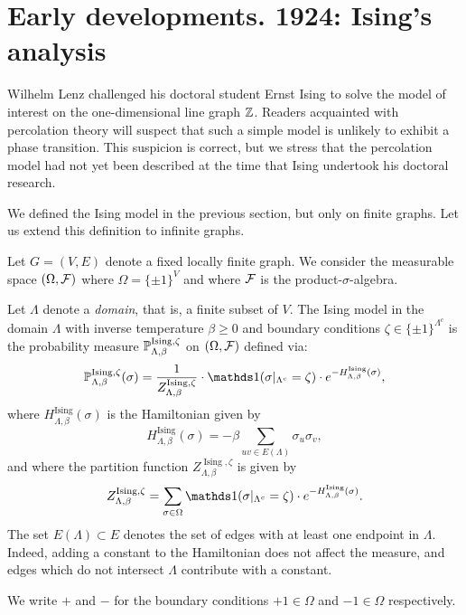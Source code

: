 \section{Early developments. 1924: Ising's analysis}
\label{sec:ising_1d}

Wilhelm Lenz challenged his doctoral student Ernst Ising
to solve the model of interest on the one-dimensional line graph $\Z$.
Readers acquainted with percolation theory
will suspect that such a simple model is unlikely to exhibit
a phase transition.
This suspicion is correct,
but we stress that the percolation model had not yet
been described at the time that Ising undertook his doctoral research.

We defined the Ising model in the previous section,
but only on finite graphs.
Let us extend this definition to infinite graphs.

\begin{definition}
    \label{def:ising_bc}
    Let $G=(V,E)$ denote a fixed locally finite graph.
    We consider the measurable space 
    $(\Omega,\calF)$ where $\Omega=\{\pm1\}^V$
    and where $\calF$ is the product-$\sigma$-algebra.

    Let $\Lambda$ denote a \emph{domain},
    that is, a finite subset of $V$.
    The Ising model in the domain $\Lambda$
    with inverse temperature $\beta \geq 0$ and boundary conditions
    $\zeta\in\{\pm1\}^{\Lambda^c}$
    is the probability measure $\P_{\Lambda,\beta}^{\operatorname{Ising},\zeta}$
    on $(\Omega,\calF)$ defined via:
    \[
        \P_{\Lambda,\beta}^{\operatorname{Ising},\zeta}(\sigma)
        =
        \frac1{Z_{\Lambda,\beta}^{\operatorname{Ising},\zeta}}
        \cdot
        \true{\sigma|_{\Lambda^c}=\zeta}\cdot e^{-H_{\Lambda,\beta}^{\operatorname{Ising}}(\sigma)}
        ,
    \]
    where $H_{\Lambda,\beta}^{\operatorname{Ising}}(\sigma)$ is the Hamiltonian given by
    \[
        H_{\Lambda,\beta}^{\operatorname{Ising}}(\sigma)
        =
        -\beta\sum_{uv\in E(\Lambda)}\sigma_u\sigma_v
        ,
    \]
    and where the partition function $Z_{\Lambda,\beta}^{\operatorname{Ising},\zeta}$ is given by
    \[
        Z_{\Lambda,\beta}^{\operatorname{Ising},\zeta}
        =
        \sum_{\sigma \in \Omega} \true{\sigma|_{\Lambda^c}=\zeta} \cdot e^{-H_{\Lambda,\beta}^{\operatorname{Ising}}(\sigma)}
        .
    \]
    The set $E(\Lambda)\subset E$ denotes 
    the set of edges with at least one endpoint in $\Lambda$.
    Indeed, adding a constant to the Hamiltonian does not affect the measure,
    and edges which do not intersect $\Lambda$ contribute with a constant.

    We write $+$ and $-$ for the boundary conditions
    $+1\in\Omega$ and $-1\in\Omega$ respectively.
\end{definition}

